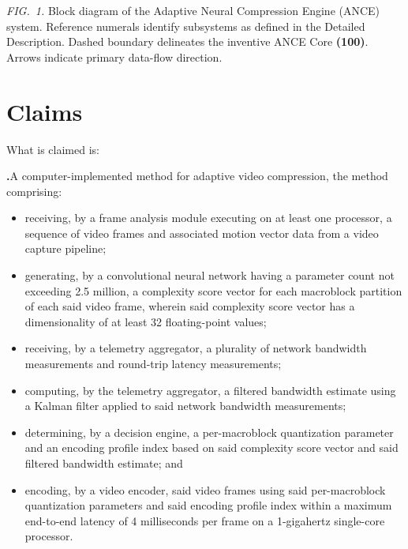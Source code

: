 \documentclass[12pt,letterpaper]{article}
\newcommand{\refnum}[1]{\textbf{(#1)}}
\newcounter{claimcnt}
\newcommand{\claim}[1]{%
  \stepcounter{claimcnt}%
  \vspace{4pt}%
  \noindent\textbf{\theclaimcnt.}\enspace #1\par%
}
\begin{document}
\vspace{6pt}
{\small\color{midgray}
\textit{FIG.\ 1.} Block diagram of the Adaptive Neural Compression Engine (ANCE) system.
Reference numerals identify subsystems as defined in the Detailed Description.
Dashed boundary delineates the inventive ANCE Core \refnum{100}.
Arrows indicate primary data-flow direction.}

\newpage
\section{Claims}\label{sec:claims}

What is claimed is:

\setcounter{claimcnt}{0}

\claim{A computer-implemented method for adaptive video compression, the method
comprising:
\begin{itemize}[leftmargin=1.5em, itemsep=2pt, topsep=4pt]
  \item receiving, by a frame analysis module executing on at least one processor, a
    sequence of video frames and associated motion vector data from a video capture
    pipeline;
  \item generating, by a convolutional neural network having a parameter count not
    exceeding 2.5 million, a complexity score vector for each macroblock partition of
    each said video frame, wherein said complexity score vector has a dimensionality of
    at least 32 floating-point values;
  \item receiving, by a telemetry aggregator, a plurality of network bandwidth
    measurements and round-trip latency measurements;
  \item computing, by the telemetry aggregator, a filtered bandwidth estimate using a
    Kalman filter applied to said network bandwidth measurements;
  \item determining, by a decision engine, a per-macroblock quantization parameter and
    an encoding profile index based on said complexity score vector and said filtered
    bandwidth estimate; and
  \item encoding, by a video encoder, said video frames using said per-macroblock
    quantization parameters and said encoding profile index within a maximum
    end-to-end latency of 4 milliseconds per frame on a 1-gigahertz single-core
    processor.
\end{itemize}}
\end{document}
